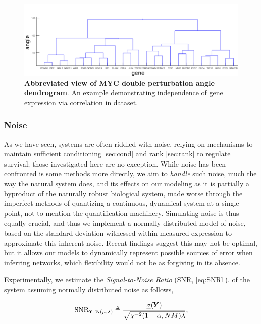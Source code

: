 \begin{figure}[H]
\centering
\includegraphics[width=1\linewidth]{4/MYC_Y_weightedDouble_dendrogram.png}
\caption{\textbf{Abbreviated view of MYC double perturbation angle dendrogram}. An example demonstrating independence of gene expression via correlation in dataset.}
\label{fig:dend}
\end{figure}

\pagebreak

\subsubsection{Noise}
\label{sec:snr}
As we have seen, systems are often riddled with noise, relying on mechanisms to maintain sufficient conditioning \cref{sec:cond} and rank \cref{sec:rank} to regulate survival; those investigated here are no exception. While noise has been confronted is some methods more directly\citep{zhang2012narromi}, we aim to \emph{handle} such noise, much the way the natural system does, and its effects on our modeling as it is partially a byproduct of the naturally robust biological system, made worse through the imperfect methods of quantizing a continuous, dynamical system at a single point, not to mention the quantification machinery. Simulating noise is thus equally crucial, and thus we implement a normally distributed model of noise, based on the standard deviation witnessed within measured expression to approximate this inherent noise. Recent findings suggest this may not be optimal, but it allows our models to dynamically represent possible sources of error when inferring networks, which flexibility would not be as forgiving in its absence.

Experimentally, we estimate the \emph{Signal-to-Noise Ratio} (SNR, \cref{eq:SNRl}). of the system assuming normally distributed noise as follows,

\begin{equation}
	\operatorname{SNR}_{{\pmb{Y}}\, \operatorname{\mathcal{N}(\mu,\lambda)}} \triangleq \frac{\underline{\sigma}({\pmb{Y}})}{\sqrt{\chi^{-2}(1-\alpha,NM)\lambda}},
  \label{eq:SNRl}
\end{equation}

